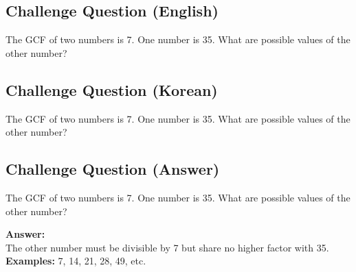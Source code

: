 \cleardoublepage
\subsection*{Challenge Question (English)}
The GCF of two numbers is 7. One number is 35. What are possible values of the other number?


\newpage
\subsection*{Challenge Question (Korean)}
The GCF of two numbers is 7. One number is 35. What are possible values of the other number?


\newpage
\subsection*{Challenge Question (Answer)}
The GCF of two numbers is 7. One number is 35. What are possible values of the other number?

\textbf{Answer:}\\
The other number must be divisible by 7 but share no higher factor with 35.\\
\textbf{Examples:} 7, 14, 21, 28, 49, etc.
